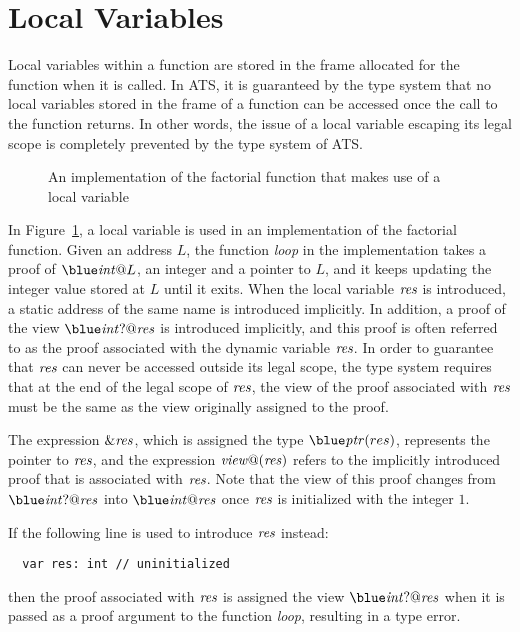 \section{Local Variables}
Local variables within a function are stored in the frame allocated for the
function when it is called. In ATS, it is guaranteed by the type system
that no local variables stored in the frame of a function can be accessed
once the call to the function returns. In other words, the issue of a local
variable escaping its legal scope is completely prevented by the type
system of ATS.

\begin{figure}[thp]

\caption{An implementation of the factorial function that makes use of a local variable}
\label{figure:fact_function_var.dats}
\end{figure}
In Figure~\ref{figure:fact_function_var.dats}, a local variable is used in
an implementation of the factorial function. Given an address $L$, the
function {\it loop} in the implementation takes a proof of $\tint@L$, an
integer and a pointer to $L$, and it keeps updating the integer value
stored at $L$ until it exits. When the local variable ${\it res}$ is
introduced, a static address of the same name is introduced implicitly. In
addition, a proof of the view $\tint?@{\it res}$ is introduced implicitly,
and this proof is often referred to as the proof associated with the
dynamic variable ${\it res}$.  In order to guarantee that ${\it res}$ can
never be accessed outside its legal scope, the type system requires that at
the end of the legal scope of ${\it res}$, the view of the proof associated
with ${\it res}$ must be the same as the view originally assigned to the
proof.

The expression ${\it \&res}$, which is assigned the type $\tptr(res)$,
represents the pointer to ${\it res}$, and the expression ${\it view@}({\it
res})$ refers to the implicitly introduced proof that is associated with
${\it res}$. Note that the view of this proof changes from $\tint?@{\it
res}$ into $\tint@{\it res}$ once ${\it res}$ is initialized with the
integer $1$.

If the following line is used to introduce ${\it res}$
instead:
\begin{verbatim}
  var res: int // uninitialized
\end{verbatim}
then the proof associated with ${\it res}$ is assigned the view
$\tint?@{\it res}$ when it is passed as a proof argument to the function
{\it loop}, resulting in a type error.

